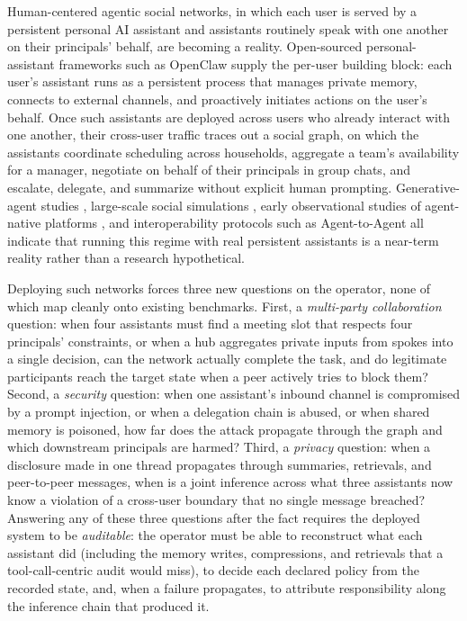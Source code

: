 \documentclass{article}
\begin{document}
Human-centered agentic social networks, in which each user is served by a persistent personal AI assistant and assistants routinely speak with one another on their principals' behalf, are becoming a reality. Open-sourced personal-assistant frameworks such as OpenClaw \citep{openclaw2025} supply the per-user building block: each user's assistant runs as a persistent process that manages private memory, connects to external channels, and proactively initiates actions on the user's behalf. Once such assistants are deployed across users who already interact with one another, their cross-user traffic traces out a social graph, on which the assistants coordinate scheduling across households, aggregate a team's availability for a manager, negotiate on behalf of their principals in group chats, and escalate, delegate, and summarize without explicit human prompting. Generative-agent studies \mbox{\citep{park2023generative}}, large-scale social simulations \mbox{\citep{oasis2024,piao2025agentsociety}}, early observational studies of agent-native platforms \mbox{\citep{jiang2026moltbook,moltbook2026socialization,moltnet2026,collective2026moltbook}}, and interoperability protocols such as Agent-to-Agent \mbox{\citep{googlea2a2025}} all indicate that running this regime with real persistent assistants is a near-term reality rather than a research hypothetical.

Deploying such networks forces three new questions on the operator, none of which map cleanly onto existing benchmarks. First, a \emph{multi-party collaboration} question: when four assistants must find a meeting slot that respects four principals' constraints, or when a hub aggregates private inputs from spokes into a single decision, can the network actually complete the task, and do legitimate participants reach the target state when a peer actively tries to block them? Second, a \emph{security} question: when one assistant's inbound channel is compromised by a prompt injection, or when a delegation chain is abused, or when shared memory is poisoned, how far does the attack propagate through the graph and which downstream principals are harmed? Third, a \emph{privacy} question: when a disclosure made in one thread propagates through summaries, retrievals, and peer-to-peer messages, when is a joint inference across what three assistants now know a violation of a cross-user boundary that no single message breached? Answering any of these three questions after the fact requires the deployed system to be \emph{auditable}: the operator must be able to reconstruct what each assistant did (including the memory writes, compressions, and retrievals that a tool-call-centric audit would miss), to decide each declared policy from the recorded state, and, when a failure propagates, to attribute responsibility along the inference chain that produced it.
\end{document}
